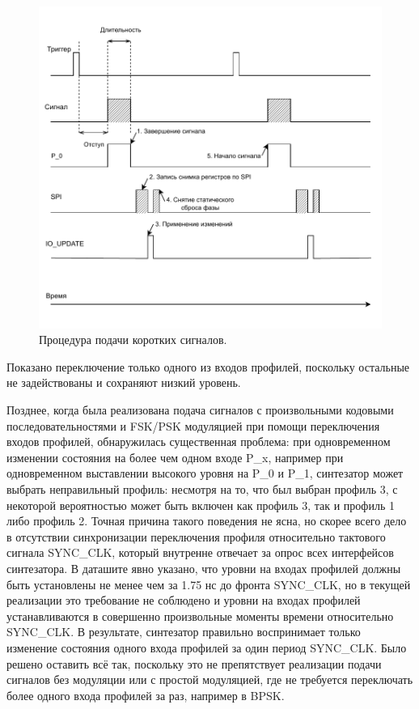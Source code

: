 \documentclass[rusmathsym, eqnumwithinsec, amspack, hyperref]{bomgost}
\begin{document}
%
%
\begin{gostfigure}
\begin{figure}[H]
\centering
\includegraphics{data/detailed_timing_diagram.drawio.pdf}
\caption{Процедура подачи коротких сигналов.}
\label{fig:detailed_timing_diagram}
\end{figure}
\end{gostfigure}

Показано переключение только одного из входов профилей, поскольку остальные не задействованы и сохраняют низкий уровень.

Позднее, когда была реализована подача сигналов с произвольными кодовыми последовательностями и FSK/PSK модуляцией при помощи переключения входов профилей, обнаружилась существенная проблема: при одновременном изменении состояния на более чем одном входе P\_x, например при одновременном выставлении высокого уровня на P\_0 и P\_1, синтезатор может выбрать неправильный профиль: несмотря на то, что был выбран профиль 3, с некоторой вероятностью может быть включен как профиль 3, так и профиль 1 либо профиль 2. Точная причина такого поведения не ясна, но скорее всего дело в отсутствии синхронизации переключения профиля относительно тактового сигнала SYNC\_CLK, который внутренне отвечает за опрос всех интерфейсов синтезатора. В даташите явно указано, что уровни на входах профилей должны быть установлены не менее чем за 1.75 нс до фронта SYNC\_CLK, но в текущей реализации это требование не соблюдено и уровни на входах профилей устанавливаются в совершенно произвольные моменты времени относительно SYNC\_CLK. В результате, синтезатор правильно воспринимает только изменение состояния одного входа профилей за один период SYNC\_CLK. Было решено оставить всё так, поскольку это не препятствует реализации подачи сигналов без модуляции или с простой модуляцией, где не требуется переключать более одного входа профилей за раз, например в BPSK.
\end{document}
